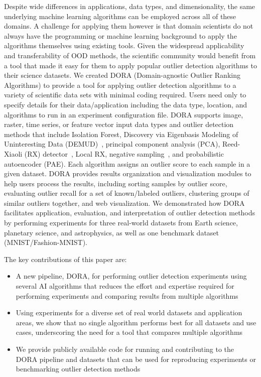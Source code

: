 \documentclass[utf8]{frontiersFPHY} %
\begin{document}
Despite wide differences in applications, data types, and dimensionality,
the same underlying machine learning algorithms can be employed across 
all of these domains. A challenge for applying them however is that domain
scientists do not always have the programming or machine learning background
to apply the algorithms themselves using existing tools. Given the widespread 
applicability and transferability of OOD methods, the scientific community 
would benefit from a tool that made it easy for them to apply popular outlier
detection algorithms to their science datasets. We created DORA 
(Domain-agnostic Outlier Ranking Algorithms) 
to provide a tool for applying outlier 
detection algorithms to a variety of scientific data sets with minimal coding
required. Users need only to specify details for their data/application 
including the data type, location, and algorithms to run in an experiment
configuration file. DORA supports image, raster, time series, 
or feature vector input data types and outlier detection methods that include
Isolation Forest, Discovery via Eigenbasis Modeling of Uninteresting Data 
(DEMUD)~\citep{wagstaff:demud13}, principal component analysis (PCA),
Reed-Xiaoli (RX) detector~\citep{reed1990adaptive},  
Local RX, negative sampling~\cite{sipple:neg-sampling20}, and probabilistic 
autoencoder (PAE). 
Each algorithm assigns an outlier 
score to each sample in a given dataset. 
DORA provides results organization and visualization 
modules to help users process the results, including sorting samples by outlier 
score, evaluating outlier recall for a set of known/labeled outliers, clustering 
groups of similar outliers together, and web visualization. 
We demonstrated how DORA
facilitates application, evaluation, and interpretation of outlier detection
methods by performing
experiments for three real-world datasets from Earth science, planetary
science, and astrophysics, as well as one benchmark dataset 
(MNIST/Fashion-MNIST). 

The key contributions of this paper are:
\begin{itemize}
\item A new pipeline, DORA, for performing outlier detection experiments using 
several AI algorithms that reduces the effort and expertise required for 
performing experiments and comparing results from multiple algorithms
\item Using experiments for a diverse set of real world datasets and 
application areas, we show that no single algorithm performs best for all 
datasets and use cases, underscoring the need for a tool that compares 
multiple algorithms
\item We provide publicly available code for running and contributing to the 
DORA pipeline and datasets that can be used for reproducing experiments or 
benchmarking outlier detection methods 
\end{itemize}
\end{document}
